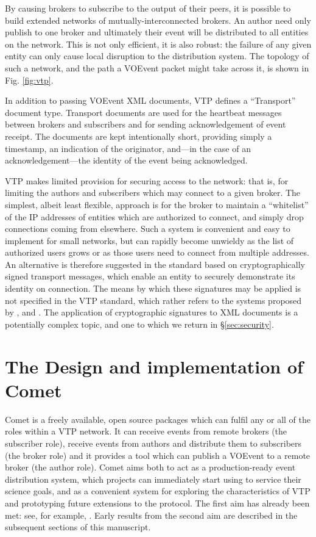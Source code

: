 \documentclass[5p,authoryear]{elsarticle}
\begin{document}
By causing brokers to subscribe to the output of their peers, it is possible
to build extended networks of mutually-interconnected brokers. An author need
only publish to one broker and ultimately their event will be distributed to
all entities on the network. This is not only efficient, it is also robust:
the failure of any given entity can only cause local disruption to the
distribution system. The topology of such a network, and the path a VOEvent
packet might take across it, is shown in Fig. \ref{fig:vtp}.

In addition to passing VOEvent XML documents, VTP defines a ``Transport''
document type. Transport documents are used for the heartbeat messages between
brokers and subscribers and for sending acknowledgement of event receipt. The
documents are kept intentionally short, providing simply a timestamp, an
indication of the originator, and---in the case of an acknowledgement---the
identity of the event being acknowledged.

VTP makes limited provision for securing access to the network: that is, for
limiting the authors and subscribers which may connect to a given broker. The
simplest, albeit least flexible, approach is for the broker to maintain a
``whitelist'' of the IP addresses of entities which are authorized to connect,
and simply drop connections coming from elsewhere. Such a system is convenient
and easy to implement for small networks, but can rapidly become unwieldy as
the list of authorized users grows or as those users need to connect from
multiple addresses. An alternative is therefore suggested in the standard
based on cryptographically signed transport messages, which enable an entity
to securely demonstrate its identity on connection. The means by which these
signatures may be applied is not specified in the VTP standard, which rather
refers to the systems proposed by \citet{Rixon:2005}, \citet{Denny:2008} and
\citet{Allen:2008}.  The application of cryptographic signatures to XML
documents is a potentially complex topic, and one to which we return in
\S\ref{sec:security}.

\section{The Design and implementation of Comet}
\label{sec:design}

Comet is a freely available, open source packages which can fulfil any or all
of the roles within a VTP network. It can receive events from remote brokers
(the subscriber role), receive events from authors and distribute them to
subscribers (the broker role) and it provides a tool which can publish a
VOEvent to a remote broker (the author role). Comet aims both to act as a
production-ready event distribution system, which projects can immediately
start using to service their science goals, and as a convenient system for
exploring the characteristics of VTP and prototyping future extensions to the
protocol. The first aim has already been met: see, for example,
\citet{Staley:2013}. Early results from the second aim are described in the
subsequent sections of this manuscript.
\end{document}
